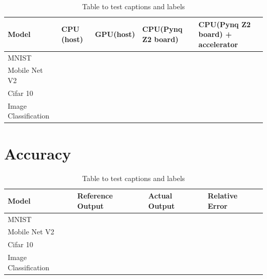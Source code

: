 
\begin{center}
\begin{table}[!htbp]
\centering
\begin{tabular}{ |p{3cm}||p{2.5cm}|p{2.5cm}|p{2.5cm}|p{2.5cm} }
 \hline
Model & CPU (host) & GPU(host) & CPU(Pynq Z2 board) & CPU(Pynq Z2 board) + accelerator \\
 \hline
 MNIST & & &\\
 Mobile Net V2& & &\\
 Cifar 10& & &\\
 Image Classification& & &\\
 \hline
 \end{tabular}
 \caption{Table to test captions and labels}
\label{table:1}
\end{table}
\end{center}

\newpage
\section{Accuracy}

\begin{center}
\begin{table}[!htbp]
\centering
\begin{tabular}{ |p{3cm}||p{3cm}|p{3cm}|p{3cm}|  }
 \hline
Model & Reference Output  & Actual Output & Relative Error\\
 \hline
 MNIST & & &\\
 Mobile Net V2& & &\\
 Cifar 10& & &\\
 Image Classification& & &\\
 \hline
 \end{tabular}
 \caption{Table to test captions and labels}
\label{table:2}
\end{table}
\end{center}